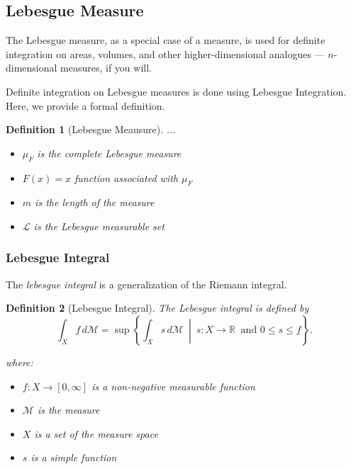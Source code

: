 \documentclass{article}
\newtheorem{definition}{Definition}
\begin{document}
\subsection{Lebesgue Measure}
The Lebesgue measure, as a special case of a measure, is used for definite integration on areas, volumes, and other higher-dimensional analogues — $n$-dimensional measures, if you will. 

Definite integration on Lebesgue measures is done using Lebesgue Integration. Here, we provide a formal definition.

\begin{mdframed}
\begin{definition}[Lebesgue Meausure]
...

\begin{itemize}
    \item $\mu_F$ is the complete Lebesgue measure
    \item $F(x)=x$ function associated with $\mu_F$
    \item $m$ is the length of the measure
    \item $\mathcal{L}$ is the Lebesgue measurable set
\end{itemize}
\end{definition}
\end{mdframed}

\subsubsection{Lebesgue Integral}
The \emph{lebesgue integral} is a generalization of the Riemann integral.

\begin{mdframed}
\begin{definition}[Lebesgue Integral]
The \emph{Lebesgue integral} is defined by
$$
\int_X f \, d \mathcal{M} = \sup \left\{ \int_X s \, d \mathcal{M} \ \middle|\ s : X \to \mathbb{R} \ \text{ and } 0 \le s \le f \right\}.
$$

where:

\begin{itemize}
    \item $f: X \rightarrow [0,\infty]$ is a non-negative measurable function
    \item $\mathcal{M}$ is the measure
    \item $X$ is a set of the measure space
    \item $s$ is a simple function
\end{itemize}
\end{definition}
\end{mdframed}
\end{document}
